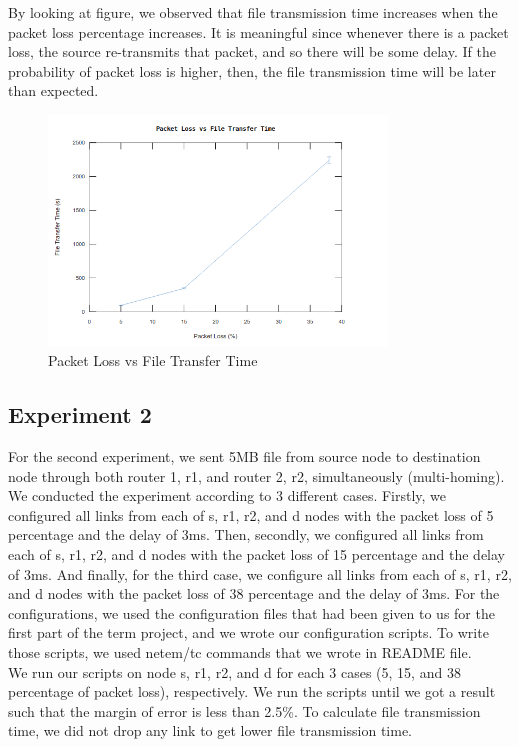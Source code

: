 \documentclass[conference]{IEEEtran}
\begin{document}
By looking at figure, we observed that file transmission time increases when the packet loss percentage increases. It is meaningful since whenever there is a packet loss, the source re-transmits that packet, and so there will be some delay. If the probability of packet loss is higher, then, the file transmission time will be later than expected.

\begin{figure}[htp]
    \centering
    \includegraphics[width=9cm]{graph_exp1.png}
    \caption{Packet Loss vs File Transfer Time}
    \label{fig:graph}
\end{figure} 

\subsection{Experiment 2}

For the second experiment, we sent 5MB file from source node to destination node through both router 1, r1, and router 2, r2, simultaneously (multi-homing). We conducted the experiment according to 3 different cases. Firstly, we configured all links from each of s, r1, r2, and d nodes with the packet loss of 5 percentage and the delay of 3ms. Then, secondly, we configured all links from each of s, r1, r2, and d nodes with the packet loss of 15 percentage and the delay of 3ms. And finally, for the third case, we configure all links from each of s, r1, r2, and d nodes with the packet loss of 38 percentage and the delay of 3ms. For the configurations, we used the configuration files that had been given to us for the first part of the term project, and we wrote our configuration scripts. To write those scripts, we used netem/tc commands that we wrote in README file. \\

We run our scripts on node s, r1, r2, and d for each 3 cases (5, 15, and 38 percentage of packet loss), respectively. We run the scripts until we got a result such that the margin of error is less than 2.5\%. To calculate file transmission time, we did not drop any link to get lower file transmission time. \\
\end{document}
